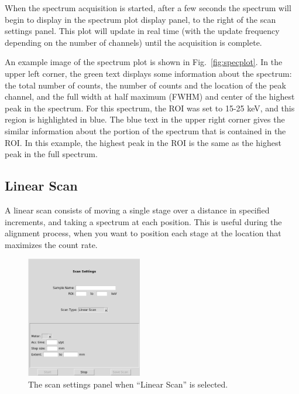 When the spectrum acquisition is started, after a few seconds the spectrum will begin to display in the spectrum plot display panel, to the right of the scan settings panel. This plot will update in real time (with the update frequency depending on the number of channels) until the acquisition is complete.

An example image of the spectrum plot is shown in Fig.~\ref{fig:specplot}. In the upper left corner, the green text displays some information about the spectrum: the total number of counts, the number of counts and the location of the peak channel, and the full width at half maximum (FWHM) and center of the highest peak in the spectrum.
For this spectrum, the ROI was set to 15-25 keV, and this region is highlighted in blue. The blue text in the upper right corner gives the similar information about the portion of the spectrum that is contained in the ROI. In this example, the highest peak in the ROI is the same as the highest peak in the full spectrum.

\subsection{Linear Scan}

A linear scan consists of moving a single stage over a distance in specified increments, and taking a spectrum at each position. This is useful during the alignment process, when you want to position each stage at the location that maximizes the count rate.

\begin{figure}
\centering
\includegraphics[width=0.45\textwidth]{linscan.png}
\caption{\label{fig:linscan} The scan settings panel when ``Linear Scan'' is selected.}
\end{figure}

